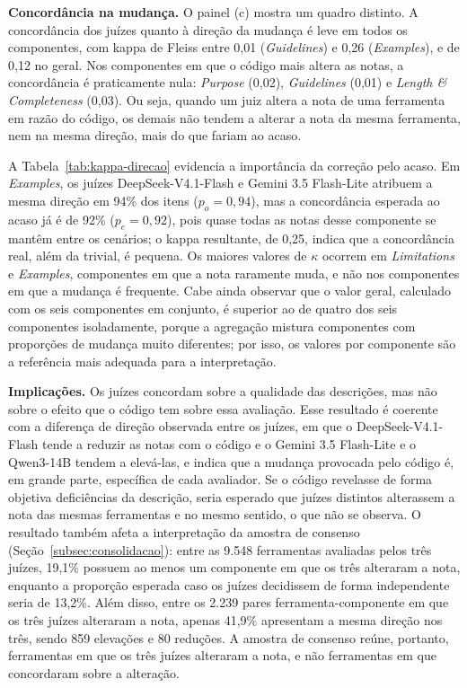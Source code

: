 \textbf{Concordância na mudança.} O painel (c) mostra um quadro distinto. A concordância dos juízes quanto à direção da mudança é leve em todos os componentes, com kappa de Fleiss entre 0,01 (\textit{Guidelines}) e 0,26 (\textit{Examples}), e de 0,12 no geral. Nos componentes em que o código mais altera as notas, a concordância é praticamente nula: \textit{Purpose} (0,02), \textit{Guidelines} (0,01) e \textit{Length \& Completeness} (0,03). Ou seja, quando um juiz altera a nota de uma ferramenta em razão do código, os demais não tendem a alterar a nota da mesma ferramenta, nem na mesma direção, mais do que fariam ao acaso.

A Tabela~\ref{tab:kappa-direcao} evidencia a importância da correção pelo acaso. Em \textit{Examples}, os juízes DeepSeek-V4.1-Flash e Gemini 3.5 Flash-Lite atribuem a mesma direção em 94\% dos itens ($p_o = 0{,}94$), mas a concordância esperada ao acaso já é de 92\% ($p_e = 0{,}92$), pois quase todas as notas desse componente se mantêm entre os cenários; o kappa resultante, de 0,25, indica que a concordância real, além da trivial, é pequena. Os maiores valores de $\kappa$ ocorrem em \textit{Limitations} e \textit{Examples}, componentes em que a nota raramente muda, e não nos componentes em que a mudança é frequente. Cabe ainda observar que o valor geral, calculado com os seis componentes em conjunto, é superior ao de quatro dos seis componentes isoladamente, porque a agregação mistura componentes com proporções de mudança muito diferentes; por isso, os valores por componente são a referência mais adequada para a interpretação.

\textbf{Implicações.} Os juízes concordam sobre a qualidade das descrições, mas não sobre o efeito que o código tem sobre essa avaliação. Esse resultado é coerente com a diferença de direção observada entre os juízes, em que o DeepSeek-V4.1-Flash tende a reduzir as notas com o código e o Gemini 3.5 Flash-Lite e o Qwen3-14B tendem a elevá-las, e indica que a mudança provocada pelo código é, em grande parte, específica de cada avaliador. Se o código revelasse de forma objetiva deficiências da descrição, seria esperado que juízes distintos alterassem a nota das mesmas ferramentas e no mesmo sentido, o que não se observa. O resultado também afeta a interpretação da amostra de consenso (Seção~\ref{subsec:consolidacao}): entre as 9.548 ferramentas avaliadas pelos três juízes, 19,1\% possuem ao menos um componente em que os três alteraram a nota, enquanto a proporção esperada caso os juízes decidissem de forma independente seria de 13,2\%. Além disso, entre os 2.239 pares ferramenta-componente em que os três juízes alteraram a nota, apenas 41,9\% apresentam a mesma direção nos três, sendo 859 elevações e 80 reduções. A amostra de consenso reúne, portanto, ferramentas em que os três juízes alteraram a nota, e não ferramentas em que concordaram sobre a alteração.
